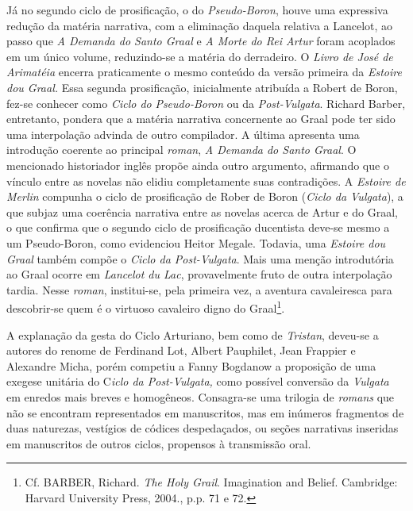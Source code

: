 Já no segundo ciclo de prosificação, o do \textit{Pseudo-Boron}, houve uma
expressiva redução da matéria narrativa, com a eliminação daquela relativa a
Lancelot, ao passo que \textit{A Demanda do Santo Graal} e \textit{A Morte do
Rei Artur} foram acoplados em um único volume, reduzindo-se a matéria do
derradeiro. O \textit{Livro de José de Arimatéia} encerra praticamente o mesmo
conteúdo da versão primeira da \textit{Estoire dou Graal.} Essa segunda
prosificação, inicialmente atribuída a Robert de Boron, fez-se conhecer como
\textit{Ciclo do }\textit{Pseudo-Boron} ou da \textit{Post-Vulgata}. Richard
Barber, entretanto, pondera que a matéria narrativa concernente ao Graal pode
ter sido uma interpolação advinda de outro compilador. A última apresenta uma
introdução coerente ao principal \textit{roman}, \textit{A Demanda do Santo
Graal}. O mencionado historiador inglês propõe ainda outro argumento, afirmando
que o vínculo entre as novelas não elidiu completamente suas contradições. A
\textit{Estoire de Merlin} compunha o ciclo de prosificação de Rober de Boron
(\textit{Ciclo da Vulgata}), a que subjaz uma coerência narrativa entre as
novelas acerca de Artur e do Graal, o que confirma que o segundo ciclo de
prosificação ducentista deve-se mesmo a um Pseudo-Boron, como evidenciou Heitor
Megale. Todavia, uma \textit{Estoire dou Graal} também compõe o \textit{Ciclo
da Post-Vulgata}. Mais uma menção introdutória ao Graal ocorre em
\textit{Lancelot du Lac}, provavelmente fruto de outra interpolação tardia.
Nesse \textit{roman}, institui-se, pela primeira vez, a aventura cavaleiresca
para descobrir-se quem é o virtuoso cavaleiro digno do Graal\footnote{ Cf.
BARBER, Richard.\textit{ The Holy Grail}. Imagination and Belief. Cambridge:
Harvard University Press, 2004.,  p.p. 71 e 72. }. 

A explanação da gesta do Ciclo Arturiano, bem como de \textit{Tristan}, deveu-se
a autores do renome de Ferdinand Lot, Albert Pauphilet, Jean Frappier e
Alexandre Micha, porém competiu a Fanny Bogdanow a proposição de uma exegese
unitária do C\textit{iclo da Post-Vulgata,} como possível conversão da
\textit{Vulgata} em enredos mais breves e homogêneos. Consagra-se uma trilogia
de \textit{romans} que não se encontram representados em manuscritos, mas em
inúmeros fragmentos de duas naturezas, vestígios de códices despedaçados, ou
seções narrativas inseridas em manuscritos de outros ciclos, propensos à
transmissão oral.

